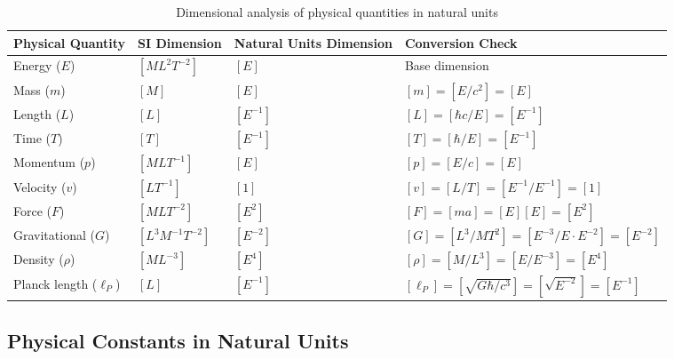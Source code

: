 \documentclass[12pt,a4paper]{article}
\begin{document}
	\begin{table}[htbp]
		\footnotesize
		\centering
		\begin{tabular}{p{3cm}p{2.5cm}p{2cm}p{7cm}}
			\toprule
			\textbf{Physical Quantity} & \textbf{SI Dimension} & \textbf{Natural Units Dimension} & \textbf{Conversion Check} \\
			\midrule
			Energy ($E$) & $[ML^2T^{-2}]$ & $[E]$ & Base dimension \checkmark \\
			Mass ($m$) & $[M]$ & $[E]$ & $[m] = [E/c^2] = [E]$ \checkmark \\
			Length ($L$) & $[L]$ & $[E^{-1}]$ & $[L] = [\hbar c/E] = [E^{-1}]$ \checkmark \\
			Time ($T$) & $[T]$ & $[E^{-1}]$ & $[T] = [\hbar/E] = [E^{-1}]$ \checkmark \\
			Momentum ($p$) & $[MLT^{-1}]$ & $[E]$ & $[p] = [E/c] = [E]$ \checkmark \\
			Velocity ($v$) & $[LT^{-1}]$ & $[1]$ & $[v] = [L/T] = [E^{-1}/E^{-1}] = [1]$ \checkmark \\
			Force ($F$) & $[MLT^{-2}]$ & $[E^2]$ & $[F] = [ma] = [E][E] = [E^2]$ \checkmark \\
			Gravitational ($G$) & $[L^3M^{-1}T^{-2}]$ & $[E^{-2}]$ & $[G] = [L^3/MT^2] = [E^{-3}/E \cdot E^{-2}] = [E^{-2}]$ \checkmark \\
			Density ($\rho$) & $[ML^{-3}]$ & $[E^4]$ & $[\rho] = [M/L^3] = [E/E^{-3}] = [E^4]$ \checkmark \\
			Planck length ($\ell_P$) & $[L]$ & $[E^{-1}]$ & $[\ell_P] = [\sqrt{G\hbar/c^3}] = [\sqrt{E^{-2}}] = [E^{-1}]$ \checkmark \\
			\bottomrule
		\end{tabular}
		\caption{Dimensional analysis of physical quantities in natural units}
	\end{table}
	
	\subsection{Physical Constants in Natural Units}
	
\end{document}
